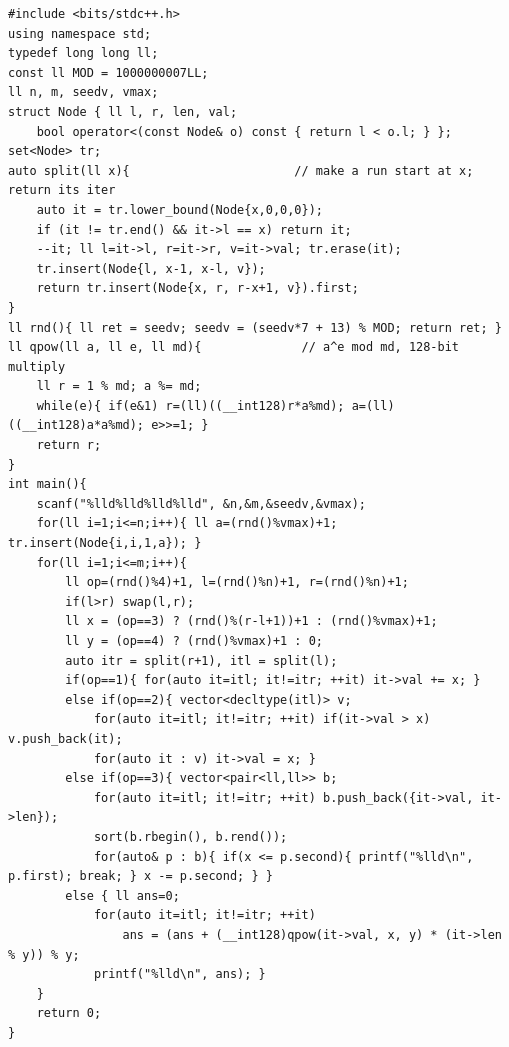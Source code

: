 \begin{lstlisting}[caption={CF 896C as a Chtholly tree: an ordered set of equal-runs, a split that carves a run at a boundary, and four run-wise operations; op 4 uses binary modular exponentiation with 128-bit products}, label={lst:c29-896c}]
#include <bits/stdc++.h>
using namespace std;
typedef long long ll;
const ll MOD = 1000000007LL;
ll n, m, seedv, vmax;
struct Node { ll l, r, len, val;
    bool operator<(const Node& o) const { return l < o.l; } };
set<Node> tr;
auto split(ll x){                       // make a run start at x; return its iter
    auto it = tr.lower_bound(Node{x,0,0,0});
    if (it != tr.end() && it->l == x) return it;
    --it; ll l=it->l, r=it->r, v=it->val; tr.erase(it);
    tr.insert(Node{l, x-1, x-l, v});
    return tr.insert(Node{x, r, r-x+1, v}).first;
}
ll rnd(){ ll ret = seedv; seedv = (seedv*7 + 13) % MOD; return ret; }
ll qpow(ll a, ll e, ll md){              // a^e mod md, 128-bit multiply
    ll r = 1 % md; a %= md;
    while(e){ if(e&1) r=(ll)((__int128)r*a%md); a=(ll)((__int128)a*a%md); e>>=1; }
    return r;
}
int main(){
    scanf("%lld%lld%lld%lld", &n,&m,&seedv,&vmax);
    for(ll i=1;i<=n;i++){ ll a=(rnd()%vmax)+1; tr.insert(Node{i,i,1,a}); }
    for(ll i=1;i<=m;i++){
        ll op=(rnd()%4)+1, l=(rnd()%n)+1, r=(rnd()%n)+1;
        if(l>r) swap(l,r);
        ll x = (op==3) ? (rnd()%(r-l+1))+1 : (rnd()%vmax)+1;
        ll y = (op==4) ? (rnd()%vmax)+1 : 0;
        auto itr = split(r+1), itl = split(l);
        if(op==1){ for(auto it=itl; it!=itr; ++it) it->val += x; }
        else if(op==2){ vector<decltype(itl)> v;
            for(auto it=itl; it!=itr; ++it) if(it->val > x) v.push_back(it);
            for(auto it : v) it->val = x; }
        else if(op==3){ vector<pair<ll,ll>> b;
            for(auto it=itl; it!=itr; ++it) b.push_back({it->val, it->len});
            sort(b.rbegin(), b.rend());
            for(auto& p : b){ if(x <= p.second){ printf("%lld\n", p.first); break; } x -= p.second; } }
        else { ll ans=0;
            for(auto it=itl; it!=itr; ++it)
                ans = (ans + (__int128)qpow(it->val, x, y) * (it->len % y)) % y;
            printf("%lld\n", ans); }
    }
    return 0;
}
\end{lstlisting}

